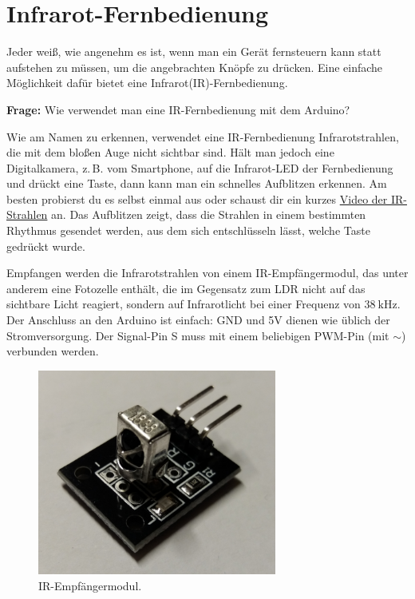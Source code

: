 \newpage
\section{Infrarot-Fernbedienung}
\label{sec:infrarot-fern}
\setcounter{aufgabennummer}{0}
\setcounter{projektnummer}{0}
Jeder weiß, wie angenehm es ist, wenn man ein Gerät fernsteuern kann statt aufstehen zu müssen, um die angebrachten Knöpfe zu drücken. Eine einfache Möglichkeit dafür bietet eine Infrarot(IR)-Fernbedienung.

\begin{ziel}
	\textbf{Frage:} Wie verwendet man eine IR-Fernbedienung mit dem Arduino?
\end{ziel}

Wie am Namen zu erkennen, verwendet eine IR-Fernbedienung Infrarotstrahlen, die mit dem bloßen Auge nicht sichtbar sind. Hält man jedoch eine Digitalkamera, z.\,B. vom Smartphone, auf die Infrarot-LED der Fernbedienung und drückt eine Taste, dann kann man ein schnelles Aufblitzen erkennen. Am besten probierst du es selbst einmal aus oder schaust dir ein kurzes \video \href{https://el-voss.de/downloads/ir-strahlen.html}{Video der IR-Strahlen} an. Das Aufblitzen zeigt, dass die Strahlen in einem bestimmten Rhythmus gesendet werden, aus dem sich entschlüsseln lässt, welche Taste gedrückt wurde.

\medskip
\begin{minipage}{0.7\textwidth}
	Empfangen werden die Infrarotstrahlen von einem IR-Empfängermodul, das unter anderem eine Fotozelle enthält, die im Gegensatz zum LDR nicht auf das sichtbare Licht reagiert, sondern auf Infrarotlicht bei einer Frequenz von $\SI{38}{\kilo\hertz}$. Der Anschluss an den Arduino ist einfach: GND und 5V dienen wie üblich der Stromversorgung. Der Signal-Pin S muss mit einem beliebigen PWM-Pin (mit $\sim$) verbunden werden.
\end{minipage}
\hfill
\begin{minipage}{0.28\textwidth}
	\begin{figure}[H]
		\centering
		\includegraphics[width=0.7\textwidth]{./pics/ir-led.png}
		\caption{IR-Empfängermodul.}
	\end{figure}	
\end{minipage}
\medskip

